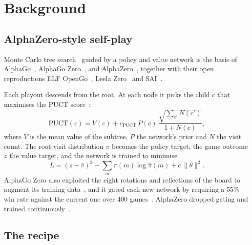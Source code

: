 \section{Background}\label{sec:background}

\subsection{AlphaZero-style self-play}

Monte Carlo tree search~\citep{coulom2006efficient,kocsis2006bandit} guided by a policy
and value network is the basis of AlphaGo~\citep{silver2016mastering}, AlphaGo
Zero~\citep{silver2017mastering}, and AlphaZero~\citep{silver2018general}, together with
their open reproductions ELF OpenGo~\citep{tian2019elf}, Leela
Zero~\citep{pascutto2019leela} and SAI~\citep{morandin2019sai}.

Each playout descends from the root. At each node it picks the child $c$ that maximises
the PUCT score~\citep{rosin2011multi,silver2017mastering}:
\begin{equation}
  \mathrm{PUCT}(c) = V(c) + c_{\mathrm{PUCT}}\,P(c)\,\frac{\sqrt{\sum_{c'} N(c')}}{1 + N(c)},
  \label{eq:puct}
\end{equation}
where $V$ is the mean value of the subtree, $P$ the network's prior and $N$ the visit
count. The root visit distribution $\pi$ becomes the policy target, the game outcome $z$
the value target, and the network is trained to minimise
\begin{equation}
  L = (z - \hat v)^2 - \textstyle\sum_m \pi(m)\log\hat\pi(m) + c\,\lVert\theta\rVert^2 .
  \label{eq:az-loss}
\end{equation}
AlphaGo Zero also exploited the eight rotations and reflections of the board to augment
its training data~\citep{silver2017mastering,silver2018general}, and it gated each new
network by requiring a 55\% win rate against the current one over 400
games~\citep{silver2017mastering}. AlphaZero dropped gating and trained
continuously~\citep{silver2018general}.

\subsection{The \katago{} recipe}\label{sec:bg-katago}

